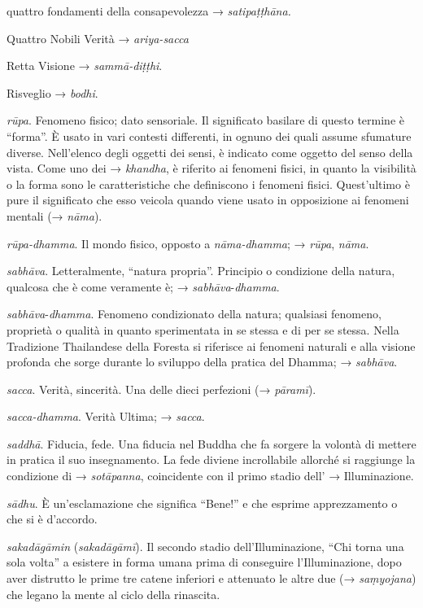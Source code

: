 quattro fondamenti della consapevolezza → \emph{satipaṭṭhāna.}

Quattro Nobili Verità → \emph{ariya-sacca}

Retta Visione → \emph{sammā-diṭṭhi}.

Risveglio → \emph{bodhi}.

\emph{rūpa}. Fenomeno fisico; dato sensoriale. Il significato basilare
di questo termine è ``forma''. È usato in vari contesti differenti, in
ognuno dei quali assume sfumature diverse. Nell'elenco degli oggetti dei
sensi, è indicato come oggetto del senso della vista. Come uno dei →
\emph{khandha}, è riferito ai fenomeni fisici, in quanto la visibilità o
la forma sono le caratteristiche che definiscono i fenomeni fisici.
Quest'ultimo è pure il significato che esso veicola quando viene usato
in opposizione ai fenomeni mentali (→ \emph{nāma}).

\emph{rūpa-dhamma}. Il mondo fisico, opposto a \emph{nāma-dhamma}; →
\emph{rūpa}, \emph{nāma}.

\emph{sabhāva}. Letteralmente, ``natura propria''. Principio o
condizione della natura, qualcosa che è come veramente è; →
\emph{sabhāva}-\emph{dhamma}.

\emph{sabhāva}-\emph{dhamma}. Fenomeno condizionato della natura;
qualsiasi fenomeno, proprietà o qualità in quanto sperimentata in se
stessa e di per se stessa. Nella Tradizione Thailandese della Foresta si
riferisce ai fenomeni naturali e alla visione profonda che sorge durante
lo sviluppo della pratica del Dhamma; → \emph{sabhāva}.

\emph{sacca}. Verità, sincerità. Una delle dieci perfezioni (→
\emph{pāramī}).

\emph{sacca-dhamma}. Verità Ultima; → \emph{sacca}.

\emph{saddhā}. Fiducia, fede. Una fiducia nel Buddha che fa sorgere la
volontà di mettere in pratica il suo insegnamento. La fede diviene
incrollabile allorché si raggiunge la condizione di → \emph{sotāpanna},
coincidente con il primo stadio dell' → Illuminazione.

\emph{sādhu}. È un'esclamazione che significa ``Bene!'' e che esprime
apprezzamento o che si è d'accordo.

\emph{sakadāgāmin} (\emph{sakadāgāmī}). Il secondo stadio
dell'Illuminazione, ``Chi torna una sola volta'' a esistere in forma
umana prima di conseguire l'Illuminazione, dopo aver distrutto le prime
tre catene inferiori e attenuato le altre due (→ \emph{saṃyojana}) che
legano la mente al ciclo della rinascita.

